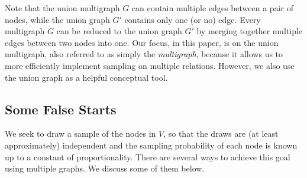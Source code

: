 \documentclass[10pt, conference]{./IEEEtran}
\begin{document}
Note that the union multigraph $G$ can contain multiple edges between a pair of nodes, while the union graph $G'$ contains only one (or no) edge. 
%
Every multigraph  $G$ can be reduced to the union graph $G'$ by merging together multiple edges between two nodes into one.
Our focus, in this paper, is on the union multigraph, also referred to as simply the {\em multigraph}, because it allows us to more efficiently implement sampling on multiple relations. However, we also use the union graph as a helpful conceptual tool.

%
%
%

%
%
%
%
%


\subsection{Some False Starts}

We seek to draw a sample of the nodes in $V$, so that the draws are (at least approximately) independent and the sampling probability of each node is known up to a constant of proportionality.  There are several ways to achieve this goal using multiple graphs. We discuss some of them below.
\end{document}
